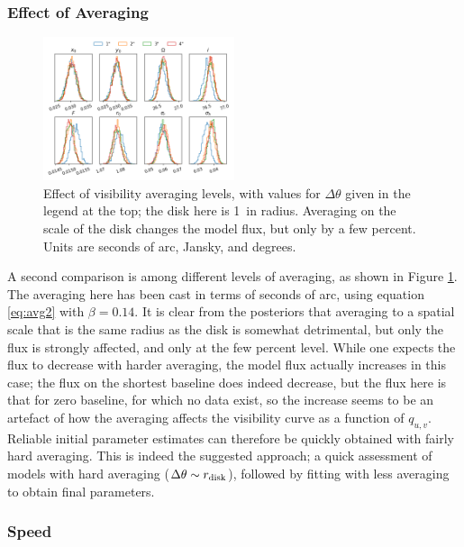\documentclass[fleqn,usenatbib]{mnras}
\begin{document}
\subsubsection{Effect of Averaging}

\begin{figure}
    \centering
    \includegraphics[width=0.5\textwidth]{avg.png}
    \caption{Effect of visibility averaging levels, with values for $\Delta \theta$ given in the legend at the top; the disk here is 1\arcsec~in radius. Averaging on the scale of the disk changes the model flux, but only by a few percent. Units are seconds of arc, Jansky, and degrees.}
    \label{fig:avg}
\end{figure}

A second comparison is among different levels of averaging, as shown in Figure \ref{fig:avg}. The averaging here has been cast in terms of seconds of arc, using equation \ref{eq:avg2} with $\beta=0.14$. It is clear from the posteriors that averaging to a spatial scale that is the same radius as the disk is somewhat detrimental, but only the flux is strongly affected, and only at the few percent level. While one expects the flux to decrease with harder averaging, the model flux actually increases in this case; the flux on the shortest baseline does indeed decrease, but the flux here is that for zero baseline, for which no data exist, so the increase seems to be an artefact of how the averaging affects the visibility curve as a function of $q_{u,v}$. Reliable initial parameter estimates can therefore be quickly obtained with fairly hard averaging. This is indeed the suggested approach; a quick assessment of models with hard averaging ($\Delta \theta \sim r_{\rm disk}$), followed by fitting with less averaging to obtain final parameters.

\subsubsection{Speed}
\end{document}
